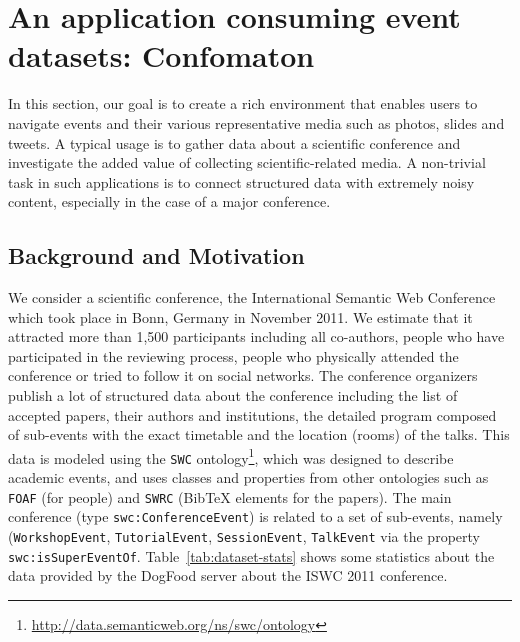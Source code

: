 




\section{An application consuming event datasets: Confomaton}
\label{sec:confomaton}

In this section, our goal is to create a rich environment that enables users to navigate events and their various representative media such as photos, slides and tweets. A typical usage is to gather data about a scientific conference and investigate the added value of collecting scientific-related media. A non-trivial task in such applications is to connect structured data with extremely noisy content, especially in the case of a major conference.

\subsection{Background and Motivation}

 We consider a scientific conference, the International Semantic Web Conference  which took place in Bonn, Germany in November 2011. We estimate that it attracted more than 1,500 participants including all co-authors, people who have participated in the reviewing process, people who physically attended the conference or tried to follow it on social networks. The conference organizers publish a lot of structured data about the conference including the list of accepted papers, their authors and institutions, the detailed program composed of sub-events with the exact timetable and the location (rooms) of the talks. This data is modeled using the \texttt{SWC} ontology\footnote{\url{http://data.semanticweb.org/ns/swc/ontology}}, which was designed to describe academic events, and uses classes and properties from other ontologies such as \texttt{FOAF} (for people) and \texttt{SWRC} (BibTeX elements for the papers). The main conference (type \texttt{swc:ConferenceEvent}) is related to a set of sub-events, namely (\texttt{WorkshopEvent}, \texttt{TutorialEvent}, \texttt{SessionEvent}, \texttt{TalkEvent} via the property \texttt{swc:isSuperEventOf}. Table~\ref{tab:dataset-stats} shows some statistics about the data provided by the DogFood server about the ISWC 2011 conference. 
 
